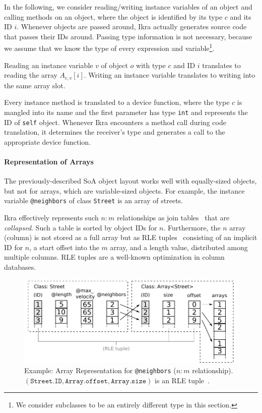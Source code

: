 \documentclass[preprint]{sigplanconf}
\begin{document}
In the following, we consider reading/writing instance variables of an object and calling methods on an object, where the object is identified by its type $c$ and its ID $i$. Whenever objects are passed around, Ikra actually generates source code that passes their IDs around. Passing type information is not necessary, because we assume that we know the type of every expression and variable\footnote{We consider subclasses to be an entirely different type in this section.}.

Reading an instance variable $v$ of object $o$ with type $c$ and ID $i$ translates to reading the array $A_{c,v}[i]$. Writing an instance variable translates to writing into the same array slot.

Every instance method is translated to a device function, where the type $c$ is mangled into its name and the first parameter has type \texttt{int} and represents the ID of \texttt{self} object. Whenever Ikra encounters a method call during code translation, it determines the receiver's type and generates a call to the appropriate device function.

\paragraph{Representation of Arrays}
The previously-described SoA object layout works well with equally-sized objects, but not for arrays, which are variable-sized objects. For example, the instance variable \texttt{@neighbors} of class \texttt{Street} is an array of streets.

Ikra effectively represents such $n:m$ relationships as join tables~\cite{Garcia-Molina:2008:DSC:1450931} that are \emph{collapsed}. Such a table is sorted by object IDs for $n$. Furthermore, the $n$ array (column) is not stored as a full array but as RLE tuples~\cite{Abadi:2006:ICE:1142473.1142548} consisting of an implicit ID for $n$, a start offset into the $m$ array, and a length value, distributed among multiple columns. RLE tuples are a well-known optimization in column databases.

\begin{figure}[!htp]
    \centering
    \includegraphics[width=\columnwidth]{column_access.pdf}
    \caption{Example: Array Representation for \texttt{@neighbors} ($n:m$ relationship). $(\texttt{Street.ID}, \texttt{Array.offset}, \texttt{Array.size})$ is an RLE tuple~\cite{Abadi:2006:ICE:1142473.1142548}.}
    \label{fig:array_repr}
\end{figure}
\end{document}
